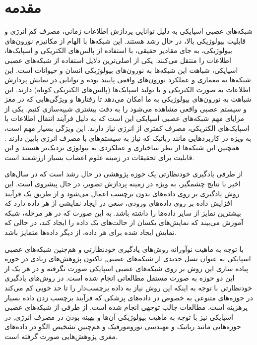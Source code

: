 \clearpage
{}
{}
\chapter*{مقدمه}


شبکه‌های عصبی اسپایکی به دلیل توانایی پردازش اطلاعات زمانی، مصرف کم انرژی و قابلیت بیولوژیکی بالا، در حال رشد هستند. این شبکه‌ها با الهام از مکانیزم نورون‌های بیولوژیکی، به جای مقادیر حقیقی، با استفاده از پالس‌های الکتریکی و اسپایک‌ها، اطلاعات را منتقل می‌کنند.
\citep{taherkhani2020review}
 یکی از اصلی‌ترین دلایل استفاده از شبکه‌های عصبی اسپایکی، شباهت این شبکه‌ها به نورون‌های بیولوژیکی انسان و حیوانات است. این شبکه‌ها به معماری و عملکرد نورون‌های واقعی پایبند بوده و توانایی در نمایش پردازش اطلاعات به صورت الکتریکی و با تولید اسپایک‌ها (پالس‌های الکتریکی کوتاه) دارند. این شباهت به نورون‌های بیولوژیکی به ما امکان می‌دهد تا رفتارها و ویژگی‌هایی که در مغز و سیستم عصبی واقعی مشاهده می‌شود را به دقت بیشتری شبیه‌سازی کنیم.
\citep{rafi2021brief}
 یکی از مزایای مهم شبکه‌های عصبی اسپایکی این است که به دلیل فرآیند انتقال اطلاعات با اسپایک‌های الکتریکی، مصرف کمتری از انرژی نیاز دارند. این ویژگی بسیار مهم است، به ویژه در کاربردهایی مانند رباتیک که نیاز به سیستم‌های با مصرف انرژی پایین دارند .
  همچنین این شبکه‌ها از نظر ساختاری و عملکردی به بیولوژی نزدیک‌تر هستند و این قابلیت برای تحقیقات در زمینه علوم اعصاب بسیار ارزشمند است.
\citep{bing2018survey}

از طرفی یادگیری خودنظارتی یک حوزه پژوهشی در حال رشد است که در سال‌های اخیر با نتایج چشمگیر، به ویژه در زمینه پردازش تصویر، در حال پیشروی است. این روش یادگیری بر روی داده‌های بدون برچسب اعمال می‌شود و از طریق یک فرآیند افزایش داده بر روی داده‌های ورودی، سعی در ایجاد نمایشی از هر داده دارد که بیشترین تمایز از سایر داده‌ها را داشته باشد. به این صورت که در هر مرحله، شبکه آموزش می‌بیند که نمایش‌های یکسان از حالت‌های یک داده را ایجاد کند، در حالی که نمایش ایجاد شده برای هر داده، از دیگر داده‌ها متمایز باشد.
\citep{gidaris2018unsupervised}

با توجه به ماهیت نوآورانه روش‌های یادگیری خودنظارتی و هم‌چنین شبکه‌های عصبی اسپایکی به عنوان نسل جدیدی از شبکه‌های عصبی, تاکنون پژوهش‌های زیادی در حوزه پیاده سازی این روش بر روی شبکه‌های عصبی اسپایکی صورت نگرفته و در هر یک از این دو حوزه به صورت مستقل مطالعاتی انجام شده است. 
در روش‌های یادگیری خودنظارتی با توجه به اینکه این روش نیاز به داده برچسب‌دار را تا حد خوبی کم می‌کند در حوزه‌های متنوعی به خصوص در داده‌های پزشکی که فرآیند برچسب زدن داده بسیار پرهزینه است, مطالعات جالب توجهی انجام شده است.
\citep{jaiswal2020survey}
\citep{shurrab2022self}
 از طرفی از شبکه‌های عصبی اسپایکی نیز با توجه به ماهیت بیولوژیکی آن‌ها و بهینه بودن در مصرف انرژی, در حوزه‌هایی مانند رباتیک و مهندسی نورومورفیک و هم‌چنین تشخیص الگو در داده‌های مغزی پژوهش‌هایی صورت گرفته است.
\citep{huynh2022implementing}
\citep{rathi2023exploring}

